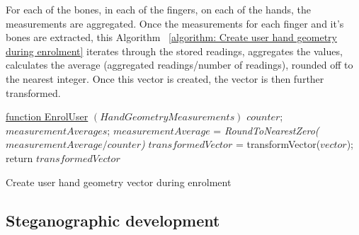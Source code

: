 For each of the bones, in each of the fingers, on each of the hands, the measurements are aggregated. Once the measurements for each finger and it's bones are extracted, this Algorithm ~\ref{algorithm: Create user hand geometry during enrolment} iterates through the stored readings, aggregates the values, calculates the average (aggregated readings/number of readings), rounded off to the nearest integer. Once this vector is created, the vector is then further transformed. 


\begin{algorithm}
    \underline{function EnrolUser} $(HandGeometryMeasurements)$\;
    $counter$; 
    $measurementAverages$; 
    $measurementAverage$ = \textit{RoundToNearestZero($measurementAverage/counter$)}
        $transformedVector$ = transformVector($vector$);
    return $transformedVector$
    
    \label{algorithm: Create user hand geometry during enrolment}
    \caption{Create user hand geometry vector during enrolment}
\end{algorithm}


\subsection{Steganographic development}


